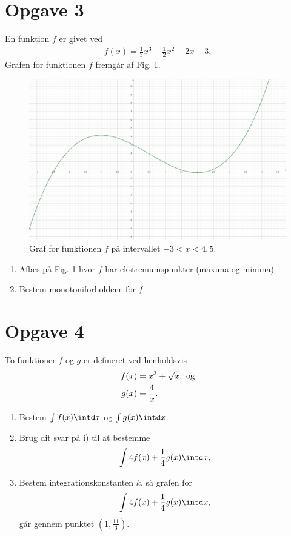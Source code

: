 \section*{Opgave 3}
En funktion $f$ er givet ved
\begin{align*}
f(x) = \frac{1}{3}x^3-\frac{1}{2}x^2-2x+3.
\end{align*}
Grafen for funktionen $f$ fremgår af Fig. \ref{fig:fgraf}.
\begin{figure}[H]
\includegraphics[width=\textwidth]{Billeder/toppunktsgraf}
\caption{Graf for funktionen $f$ på intervallet $-3<x<4,5$.}
\label{fig:fgraf}
\end{figure}
\begin{enumerate}[label=\roman*)]
\item Aflæs på Fig. \ref{fig:fgraf} hvor $f$ har ekstremumspunkter (maxima og minima).
\item Bestem monotoniforholdene for $f$.
\end{enumerate}

\section*{Opgave 4}
To funktioner $f$ og $g$ er defineret ved henholdsvis
\begin{align*}
f(x) &= x^3+\sqrt{x}, \textnormal{ og}\\
g(x) &= \frac{4}{x}.
\end{align*}
\begin{enumerate}[label=\roman*)]
\item Bestem $\int f(x) \intd x $ og $\int g(x) \intd x$.
\item Brug dit svar på i) til at bestemme 
\begin{align*}
\int 4f(x) + \frac{1}{4}g(x) \intd x,
\end{align*}
\item Bestem integrationskonstanten $k$, så grafen for 
\begin{align*} 
\int 4f(x) + \frac{1}{4}g(x) \intd x,
\end{align*}
går gennem punktet $(1,\frac{11}{3})$.
\end{enumerate}